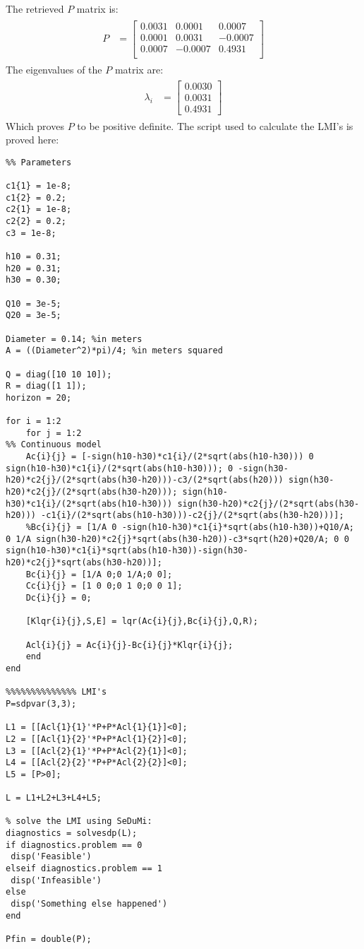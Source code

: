 The retrieved $P$ matrix is:
\begin{eqnarray}
\begin{aligned}
P&=\begin{bmatrix}
0.0031 & 0.0001 & 0.0007\\
0.0001 & 0.0031 & -0.0007\\
0.0007 & -0.0007 & 0.4931\\
\end{bmatrix}
\end{aligned}
\end{eqnarray}
The eigenvalues of the $P$ matrix are:
\begin{eqnarray}
\begin{aligned}
\lambda_i&=\begin{bmatrix}
0.0030\\
0.0031\\
0.4931
\end{bmatrix}
\end{aligned}
\end{eqnarray}
Which proves $P$ to be positive definite.
\newpage
The script used to calculate the LMI's is proved here:
\begin{lstlisting}
%% Parameters

c1{1} = 1e-8;
c1{2} = 0.2;
c2{1} = 1e-8;
c2{2} = 0.2;
c3 = 1e-8;

h10 = 0.31;
h20 = 0.31;
h30 = 0.30;

Q10 = 3e-5;
Q20 = 3e-5;

Diameter = 0.14; %in meters
A = ((Diameter^2)*pi)/4; %in meters squared

Q = diag([10 10 10]);
R = diag([1 1]);
horizon = 20;

for i = 1:2
    for j = 1:2
%% Continuous model
    Ac{i}{j} = [-sign(h10-h30)*c1{i}/(2*sqrt(abs(h10-h30))) 0 sign(h10-h30)*c1{i}/(2*sqrt(abs(h10-h30))); 0 -sign(h30-h20)*c2{j}/(2*sqrt(abs(h30-h20)))-c3/(2*sqrt(abs(h20))) sign(h30-h20)*c2{j}/(2*sqrt(abs(h30-h20))); sign(h10-h30)*c1{i}/(2*sqrt(abs(h10-h30))) sign(h30-h20)*c2{j}/(2*sqrt(abs(h30-h20))) -c1{i}/(2*sqrt(abs(h10-h30)))-c2{j}/(2*sqrt(abs(h30-h20)))];
    %Bc{i}{j} = [1/A 0 -sign(h10-h30)*c1{i}*sqrt(abs(h10-h30))+Q10/A; 0 1/A sign(h30-h20)*c2{j}*sqrt(abs(h30-h20))-c3*sqrt(h20)+Q20/A; 0 0 sign(h10-h30)*c1{i}*sqrt(abs(h10-h30))-sign(h30-h20)*c2{j}*sqrt(abs(h30-h20))];
    Bc{i}{j} = [1/A 0;0 1/A;0 0];
    Cc{i}{j} = [1 0 0;0 1 0;0 0 1];
    Dc{i}{j} = 0;
        
    [Klqr{i}{j},S,E] = lqr(Ac{i}{j},Bc{i}{j},Q,R);
    
    Acl{i}{j} = Ac{i}{j}-Bc{i}{j}*Klqr{i}{j};
    end
end

%%%%%%%%%%%%%% LMI's
P=sdpvar(3,3);

L1 = [[Acl{1}{1}'*P+P*Acl{1}{1}]<0];
L2 = [[Acl{1}{2}'*P+P*Acl{1}{2}]<0];
L3 = [[Acl{2}{1}'*P+P*Acl{2}{1}]<0];
L4 = [[Acl{2}{2}'*P+P*Acl{2}{2}]<0];
L5 = [P>0];

L = L1+L2+L3+L4+L5; 

% solve the LMI using SeDuMi:
diagnostics = solvesdp(L);
if diagnostics.problem == 0
 disp('Feasible')
elseif diagnostics.problem == 1
 disp('Infeasible')
else
 disp('Something else happened')
end

Pfin = double(P);
\end{lstlisting}
